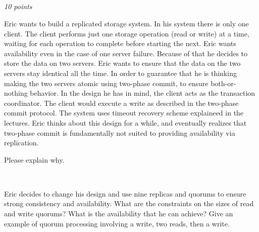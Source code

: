 \documentclass[a4paper]{article}
\newcommand{\points}[1]{\subsection{} \textit{#1 points}\\}
\newcommand{\question}[2][]{
  \parbox[t]{\textwidth}{
    \ifthenelse{\equal{#1}{}}{}{#1)}
    \parbox[t]{0.95\textwidth}{#2}}\\}
\begin{document}
\points{10}
\label{2013-03:quorum}
\question[a]{Eric wants to build a replicated storage system. In his
  system there is only one client. The client performs just one
  storage operation (read or write) at a time, waiting for each
  operation to complete before starting the next. Eric wants
  availability even in the case of one server failure. Because of that
  he decides to store the data on two servers. Eric wants to ensure
  that the data on the two servers stay identical all the time. In
  order to guarantee that he is thinking making the two servers atomic
  using two-phase commit, to ensure both-or-nothing behavior. In the
  design he has in mind, the client acts as the transaction
  coordinator. The client would execute a write as described in the
  two-phase commit protocol. The system uses timeout recovery scheme
  explaineed in the lectures. Eric thinks about this design for a
  while, and eventually realizes that two-phase commit is
  fundamentally not suited to providing availability via
  replication.

  Please explain why.}
\question[b]{
  Eric decides to change his design and use nine replicas
  and quorums to ensure strong consistency and availability. What are
  the constraints on the sizes of read and write quorums? What is the
  availability that he can achieve? Give an example of quorum
  processing involving a write, two reads, then a write.}
% 
\end{document}

